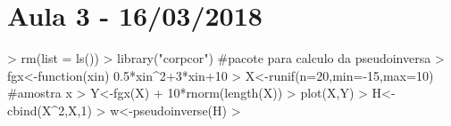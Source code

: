 \documentclass{article}
\begin{document}


\section{Aula 3 - 16/03/2018}

\begin{Schunk}
\begin{Sinput}
> rm(list = ls())
> library("corpcor") #pacote para calculo da pseudoinversa
> fgx<-function(xin) 0.5*xin^2+3*xin+10
> X<-runif(n=20,min=-15,max=10) #amostra x
> Y<-fgx(X) + 10*rnorm(length(X))
> plot(X,Y)
> H<-cbind(X^2,X,1)
> w<-pseudoinverse(H) %*% Y
> 
\end{Sinput}
\end{Schunk}
\end{document}
